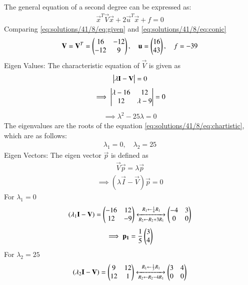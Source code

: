 The general equation of a second degree can be expressed as: 
\begin{align}
   \vec{x}^T\vec{V}\vec{x}+2\vec{u}^T\vec{x}+f=0 \label{eq:solutions/41/8/eq:conic}
\end{align}
Comparing \eqref{eq:solutions/41/8/eq:given} and \eqref{eq:solutions/41/8/eq:conic}
\begin{align}
\mathbf{V}=\mathbf{V}^T =\begin{pmatrix}16 & -12 \\ -12 & 9 \end{pmatrix}, \quad\mathbf{u}=\begin{pmatrix}16 \\ 43\end{pmatrix},\quad f=-39 \label{eq:solutions/41/8/eq:parametrics}
\end{align}
{Eigen Values:}
The characteristic equation of $\vec{V}$ is given as
\begin{align}
\begin{vmatrix}\lambda \mathbf{I}-\mathbf{V}\end{vmatrix} = 0
\end{align}
\begin{align}
\implies \begin{vmatrix}\lambda-16 & 12 \\ 12 & \lambda-9\end{vmatrix} =0
\end{align}
\begin{align}
\implies \lambda^2-25\lambda=0 \label{eq:solutions/41/8/eq:chartistic}
\end{align}
The eigenvalues are the roots of the equation \eqref{eq:solutions/41/8/eq:chartistic}, which are as follows:
\begin{align}
 \lambda_1=0, \quad  \lambda_2=25 \label{eq:solutions/41/8/eq:eigenval}
\end{align}
{Eigen Vectors:}
The eigen vector $\vec{p}$ is defined as
\begin{align}
\vec{V}\vec{p}=\lambda\vec{p}     
\end{align}
\begin{align}
\implies (\lambda \vec{I} - \vec{V} ) \vec{p} = 0
\end{align}
For $\lambda_1 = 0 $
\begin{align}
(\lambda_1 \mathbf{I}-\mathbf{V} ) = \begin{pmatrix}-16 & 12 \\ 12 & -9 \end{pmatrix}\xleftrightarrow[R_2\leftarrow R_2+3R_1]{R_1\leftarrow \frac{1}{4}R_1}\begin{pmatrix}-4 & 3\\0 & 0\end{pmatrix}
\end{align}
\begin{align}
\implies \mathbf{p_1} = \frac{1}{5} \begin{pmatrix}3 \\ 4\end{pmatrix} \label{eq:solutions/41/8/eq:p1val}
\end{align}
For $\lambda_2 = 25$
\begin{align}
(\lambda_2 \mathbf{I}-\mathbf{V} ) = \begin{pmatrix}9 & 12 \\ 12 & 1\end{pmatrix}\xleftrightarrow[R_2\leftarrow R_2-4R_1]{R_1\leftarrow \frac{1}{3}R_1}\begin{pmatrix}3 & 4\\0 & 0\end{pmatrix}
\end{align}
